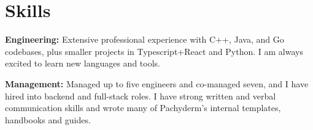 \documentclass[10pt, letterpaper]{article}
\begin{document}
\newcommand{\AND}{\unskip
    \cleaders\copy\ANDbox\hskip\wd\ANDbox
    \ignorespaces
}

\newsavebox\ANDbox
\sbox\ANDbox{}

\placelastupdatedtext


\section{Skills}

\begin{onecolentry}
    \begin{highlights}
        \item\textbf{Engineering:} Extensive professional experience with C++, Java, and Go codebases, plus smaller projects in Typescript+React and Python. I am always excited to learn new languages and tools.
        \item\textbf{Management:} Managed up to five engineers and co-managed seven, and I have hired into backend and full-stack roles. I have strong written and verbal communication skills and wrote many of Pachyderm's internal templates, handbooks and guides.
    \end{highlights}
\end{onecolentry}
\end{document}
